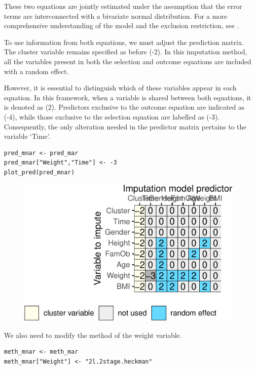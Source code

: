 \documentclass[
  article]{jss}
\begin{document}
These two equations are jointly estimated under the assumption that the
error terms are interconnected with a bivariate normal distribution. For
a more comprehensive understanding of the model and the exclusion
restriction, see \cite{munoz2023}.

To use information from both equations, we must adjust the prediction
matrix. The cluster variable remains specified as before (-2). In this
imputation method, all the variables present in both the selection and
outcome equations are included with a random effect.

However, it is essential to distinguish which of these variables appear
in each equation. In this framework, when a variable is shared between
both equations, it is denoted as (2). Predictors exclusive to the
outcome equation are indicated as (-4), while those exclusive to the
selection equation are labelled as (-3). Consequently, the only
alteration needed in the predictor matrix pertains to the variable
`Time'.

\begin{verbatim}
pred_mnar <- pred_mar
pred_mnar["Weight","Time"] <- -3
plot_pred(pred_mnar)
\end{verbatim}

\begin{figure}[h]

{\centering \includegraphics{manuscript_files/figure-pdf/obesity-predmnar-1.pdf}

}

\end{figure}

We also need to modify the method of the weight variable.

\begin{verbatim}
meth_mnar <- meth_mar
meth_mnar["Weight"] <- "2l.2stage.heckman"
\end{verbatim}
\end{document}
